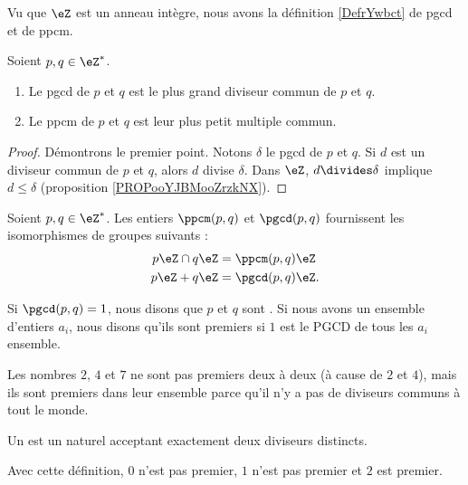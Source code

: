 Vu que \( \eZ\) est un anneau intègre, nous avons la définition \ref{DefrYwbct} de pgcd et de ppcm.
\begin{proposition}       \label{PROPooAVRGooUfhjwF}
    Soient \( p,q\in\eZ^*\). 
    \begin{enumerate}
        \item
            Le pgcd de \( p\) et \( q\) est le plus grand diviseur commun de \( p\) et \( q\). 
        \item
            Le ppcm de \( p\) et \( q\) est leur plus petit multiple commun.
    \end{enumerate}
\end{proposition}

\begin{proof}
    Démontrons le premier point. Notons \( \delta\) le pgcd de \( p\) et \( q\). Si \( d\) est un diviseur commun de \( p\) et \( q\), alors \( d\) divise \( \delta\). Dans \( \eZ\), \( d\divides \delta\) implique \( d\leq\delta\) (proposition \ref{PROPooYJBMooZrzkNX}).
\end{proof}

\begin{lemma}
    Soient \( p,q\in\eZ^*\). Les entiers \( \ppcm(p,q)\) et \( \pgcd(p,q)\) fournissent les isomorphismes de groupes suivants :
\begin{subequations}
    \begin{align}
        p\eZ\cap q\eZ&=\ppcm(p,q)\eZ\\
        p\eZ + q\eZ&=\pgcd(p,q)\eZ.
    \end{align}
\end{subequations}
\end{lemma}

\begin{definition}  \label{DefZHRXooNeWIcB}
    Si \( \pgcd(p,q)=1\), nous disons que \( p\) et \( q\) sont . Si nous avons un ensemble d'entiers \( a_i\), nous disons qu'ils sont premiers  si \( 1\) est le PGCD de tous les \( a_i\) ensemble.
\end{definition}

Les nombres \( 2\), \( 4\) et \( 7\) ne sont pas premiers deux à deux (à cause de \( 2\) et \( 4\)), mais ils sont premiers dans leur ensemble parce qu'il n'y a pas de diviseurs communs à tout le monde.

\begin{definition}
    Un  est un naturel acceptant exactement deux diviseurs distincts.
\end{definition}
Avec cette définition, \( 0\) n'est pas premier, \( 1\) n'est pas premier et \( 2\) est premier.

